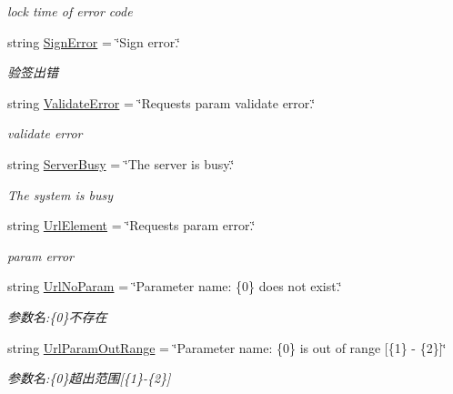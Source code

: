 \begin{DoxyCompactItemize}
\begin{DoxyCompactList}\small\item\em lock time of error code \end{DoxyCompactList}\item 
string \mbox{\hyperlink{class_t_net_1_1_lang_1_1_language_a04a6ba81965f6884f01627f1aebca2ff}{Sign\+Error}} = \char`\"{}Sign error.\char`\"{}
\begin{DoxyCompactList}\small\item\em 验签出错 \end{DoxyCompactList}\item 
string \mbox{\hyperlink{class_t_net_1_1_lang_1_1_language_a169ffa13ad898518ba25a8e6152cabea}{Validate\+Error}} = \char`\"{}Request\textquotesingle{}s param validate error.\char`\"{}
\begin{DoxyCompactList}\small\item\em validate error \end{DoxyCompactList}\item 
string \mbox{\hyperlink{class_t_net_1_1_lang_1_1_language_ac2b5a3cde294186ce50a2b3f63119c7e}{Server\+Busy}} = \char`\"{}The server is busy.\char`\"{}
\begin{DoxyCompactList}\small\item\em The system is busy \end{DoxyCompactList}\item 
string \mbox{\hyperlink{class_t_net_1_1_lang_1_1_language_aee2d4350d1336065f4e171e2bcf33b0b}{Url\+Element}} = \char`\"{}Request\textquotesingle{}s param error.\char`\"{}
\begin{DoxyCompactList}\small\item\em param error \end{DoxyCompactList}\item 
string \mbox{\hyperlink{class_t_net_1_1_lang_1_1_language_ae3b82b6ec41445ca014b29a974d397ab}{Url\+No\+Param}} = \char`\"{}Parameter name\+: \{0\} does not exist.\char`\"{}
\begin{DoxyCompactList}\small\item\em 参数名\+:\{0\}不存在 \end{DoxyCompactList}\item 
string \mbox{\hyperlink{class_t_net_1_1_lang_1_1_language_af907649d51b824cc1c9e4a5967e0e8c2}{Url\+Param\+Out\+Range}} = \char`\"{}Parameter name\+: \{0\} is out of range \mbox{[}\{1\} -\/ \{2\}\mbox{]}\char`\"{}
\begin{DoxyCompactList}\small\item\em 参数名\+:\{0\}超出范围\mbox{[}\{1\}-\/\{2\}\mbox{]} \end{DoxyCompactList}\item 

\end{DoxyCompactItemize}
